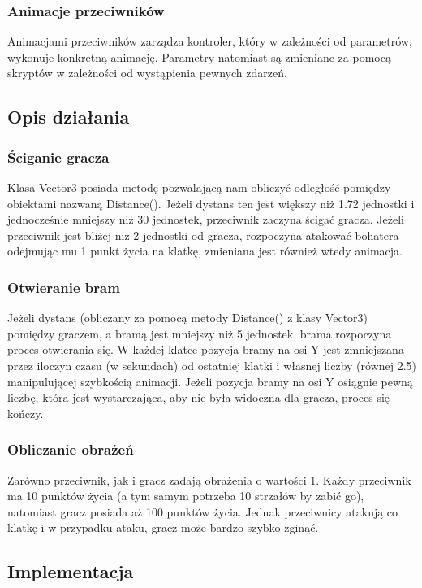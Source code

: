 \documentclass[12pt,a4paper]{article}
\newcommand{\si}{ś}
\begin{document}
	\subsubsection*{Animacje przeciwników} 
	Animacjami przeciwników zarządza kontroler, który w zależno\si ci od parametrów, wykonuje konkretną animację. Parametry natomiast są zmieniane za pomocą skryptów w zależno\si ci od wystąpienia pewnych zdarzeń.
	\subsection*{Opis działania} 
	\subsubsection*{Ściganie gracza} 
	Klasa Vector3 posiada metodę pozwalającą nam obliczyć odległo\si ć pomiędzy obiektami nazwaną Distance(). Jeżeli dystans ten jest większy niż 1.72 jednostki i jednocze\si nie mniejszy niż 30 jednostek, przeciwnik zaczyna \si cigać gracza. Jeżeli przeciwnik jest bliżej niż 2 jednostki od gracza, rozpoczyna atakować bohatera odejmując mu 1 punkt życia na klatkę, zmieniana jest również wtedy animacja. 
	\subsubsection*{Otwieranie bram} 
	Jeżeli dystans (obliczany za pomocą metody Distance() z klasy Vector3) pomiędzy graczem, a bramą jest mniejszy niż 5 jednostek, brama rozpoczyna proces otwierania się. W każdej klatce pozycja bramy na osi Y jest zmniejszana przez iloczyn czasu (w sekundach) od ostatniej klatki i własnej liczby (równej 2.5) manipulującej szybko\si cią animacji. Jeżeli pozycja bramy na osi Y osiągnie pewną liczbę, która jest wystarczająca, aby nie była widoczna dla gracza, proces się kończy.
	\subsubsection*{Obliczanie obrażeń} 
	Zarówno przeciwnik, jak i gracz zadają obrażenia o warto\si ci 1. Każdy przeciwnik ma 10 punktów życia (a tym samym potrzeba 10 strzałów by zabić go), natomiast gracz posiada aż 100 punktów życia. Jednak przeciwnicy atakują co klatkę i w przypadku ataku, gracz może bardzo szybko zginąć.
	
	
	\subsection*{Implementacja}
\end{document}

